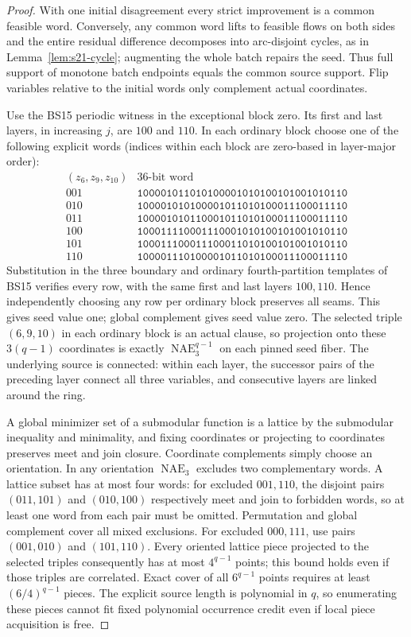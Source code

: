 \documentclass[11pt]{article}
\begin{document}
\begin{proof}
With one initial disagreement every strict improvement is a common feasible word. Conversely, any common word lifts to feasible flows on both sides and the entire residual difference decomposes into arc-disjoint cycles, as in Lemma~\ref{lem:s21-cycle}; augmenting the whole batch repairs the seed. Thus full support of monotone batch endpoints equals the common source support. Flip variables relative to the initial words only complement actual coordinates.

Use the BS15 periodic witness in the exceptional block zero. Its first and last layers, in increasing $j$, are $100$ and $110$. In each ordinary block choose one of the following explicit words (indices within each block are zero-based in layer-major order):
\[
\begin{array}{c|l}
(z_6,z_9,z_{10})&\text{36-bit word}\\ \hline
001&\texttt{100001011010100001010100101001010110}\\
010&\texttt{100001010100001011010100011100011110}\\
011&\texttt{100001010110001011010100011100011110}\\
100&\texttt{100011110001110001010100101001010110}\\
101&\texttt{100011100011100011010100101001010110}\\
110&\texttt{100001110100001011010100011100011110}
\end{array}
\]
Substitution in the three boundary and ordinary fourth-partition templates of BS15 verifies every row, with the same first and last layers $100,110$. Hence independently choosing any row per ordinary block preserves all seams. This gives seed value one; global complement gives seed value zero. The selected triple $(6,9,10)$ in each ordinary block is an actual clause, so projection onto these $3(q-1)$ coordinates is exactly $\operatorname{NAE}_3^{q-1}$ on each pinned seed fiber. The underlying source is connected: within each layer, the successor pairs of the preceding layer connect all three variables, and consecutive layers are linked around the ring.

A global minimizer set of a submodular function is a lattice by the submodular inequality and minimality, and fixing coordinates or projecting to coordinates preserves meet and join closure. Coordinate complements simply choose an orientation. In any orientation $\operatorname{NAE}_3$ excludes two complementary words. A lattice subset has at most four words: for excluded $001,110$, the disjoint pairs $(011,101)$ and $(010,100)$ respectively meet and join to forbidden words, so at least one word from each pair must be omitted. Permutation and global complement cover all mixed exclusions. For excluded $000,111$, use pairs $(001,010)$ and $(101,110)$. Every oriented lattice piece projected to the selected triples consequently has at most $4^{q-1}$ points; this bound holds even if those triples are correlated. Exact cover of all $6^{q-1}$ points requires at least $(6/4)^{q-1}$ pieces. The explicit source length is polynomial in $q$, so enumerating these pieces cannot fit fixed polynomial occurrence credit even if local piece acquisition is free.
\end{proof}
\end{document}
